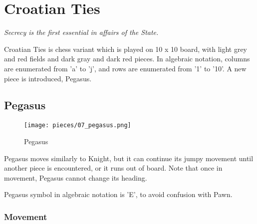 

\chapter*{Croatian Ties}
\label{ch:Croatian Ties}

\begin{flushright}
\parbox{0.7\textwidth}{
\emph{Secrecy is the first essential in affairs of the State. \\
 } }
\end{flushright}

\noindent
Croatian Ties is chess variant which is played on 10 x 10 board,
with light grey and red fields and dark gray and dark red pieces.
In algebraic notation, columns are enumerated from 'a' to 'j',
and rows are enumerated from '1' to '10'. A new piece is
introduced, Pegasus.

\clearpage %

\section*{Pegasus}
\label{sec:Croatian Ties/Pegasus}

\noindent
\begin{wrapfigure}[9]{l}{0.4\textwidth}
\centering
\texttt{[image: pieces/07\_pegasus.png]}
\caption{Pegasus}
\label{fig:07_pegasus}
\end{wrapfigure}
Pegasus moves similarly to Knight, but it can continue its jumpy movement
until another piece is encountered, or it runs out of board. Note that once
in movement, Pegasus cannot change its heading.

Pegasus symbol in algebraic notation is 'E', to avoid confusion with Pawn.

\vspace{2.0\baselineskip}
\subsection*{Movement}
\label{sec:Croatian Ties/Pegasus/Movement}

